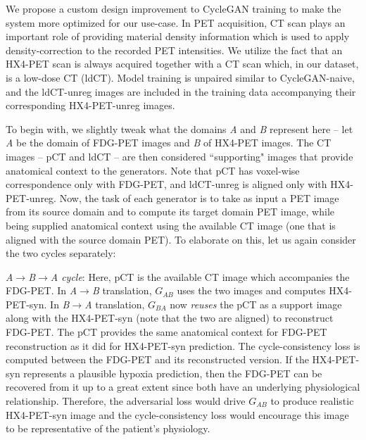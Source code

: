We propose a custom design improvement to CycleGAN training to make the system more optimized for our use-case. In PET acquisition, CT scan plays an important role of providing material density information which is used to apply density-correction to the recorded PET intensities. We utilize the fact that an HX4-PET scan is always acquired together with a CT scan which, in our dataset, is a low-dose CT (ldCT). Model training is unpaired similar to CycleGAN-naive, and the ldCT-unreg images are included in the training data accompanying their corresponding HX4-PET-unreg images. 

To begin with, we slightly tweak what the domains \textit{A} and \textit{B} represent here -- let \textit{A} be the domain of FDG-PET images and \textit{B} of HX4-PET images. The CT images -- pCT and ldCT -- are then considered ``supporting" images that provide anatomical context to the generators. Note that pCT has voxel-wise correspondence only with FDG-PET, and ldCT-unreg is aligned only with HX4-PET-unreg. Now, the task of each generator is to take as input a PET image from its source domain and to compute its target domain PET image, while being supplied anatomical context using the available CT image (one that is aligned with the source domain PET). To elaborate on this, let us again consider the two cycles separately: 

\vspace{4mm}
\noindent
\textit{A$\rightarrow$B$\rightarrow$A cycle}: Here, pCT is the available CT image which accompanies the FDG-PET. In \textit{A}$\rightarrow$\textit{B} translation, $G_{AB}$ uses the two images and computes HX4-PET-syn. In \textit{B}$\rightarrow$\textit{A} translation, $G_{BA}$ now \textit{reuses} the pCT as a support image along with the HX4-PET-syn (note that the two are aligned) to reconstruct FDG-PET. The pCT provides the same anatomical context for FDG-PET reconstruction as it did for HX4-PET-syn prediction. The cycle-consistency loss is computed between the FDG-PET and its reconstructed version. If the HX4-PET-syn represents a plausible hypoxia prediction, then the FDG-PET can be recovered from it up to a great extent since both have an underlying physiological relationship. Therefore, the adversarial loss would drive $G_{AB}$ to produce realistic HX4-PET-syn image and the cycle-consistency loss would encourage this image to be representative of the patient's physiology. 

